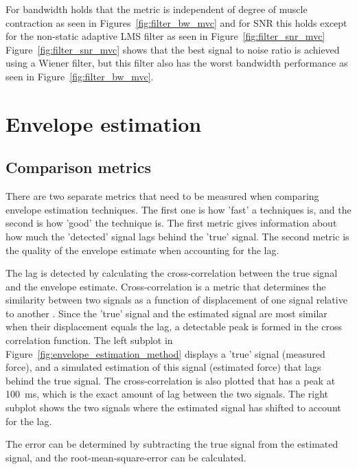For bandwidth holds that the metric is independent of degree of muscle contraction as seen in Figures~\ref{fig:filter_bw_mvc} and for SNR this holds except for the non-static adaptive LMS filter as seen in Figure~\ref{fig:filter_snr_mvc}
Figure~\ref{fig:filter_snr_mvc} shows that the best signal to noise ratio is achieved using a Wiener filter, but this filter also has the worst bandwidth performance as seen in Figure~\ref{fig:filter_bw_mvc}. 

\section{Envelope estimation}
\subsection{Comparison metrics}
There are two separate metrics that need to be measured when comparing envelope estimation techniques. The first one is how 'fast' a techniques is, and the second is how 'good' the technique is. The first metric gives information about how much the 'detected' signal lags behind the 'true' signal. The second metric is the quality of the envelope estimate when accounting for the lag.

The lag is detected by calculating the cross-correlation between the true signal and the envelope estimate. Cross-correlation is a metric that determines the similarity between two signals as a function of displacement of one signal relative to another \cite{wiki:cross_correlation}. Since the 'true' signal and the estimated signal are most similar when their displacement equals the lag, a detectable peak is formed in the cross correlation function. The left subplot in Figure~\ref{fig:envelope_estimation_method} displays a 'true' signal (measured force), and a simulated estimation of this signal (estimated force) that lags behind the true signal. The cross-correlation is also plotted that has a peak at \SI{100}{\milli\second}, which is the exact amount of lag between the two signals. The right subplot shows the two signals where the estimated signal has shifted to account for the lag. 

The error can be determined by subtracting the true signal from the estimated signal, and the root-mean-square-error can be calculated. 

